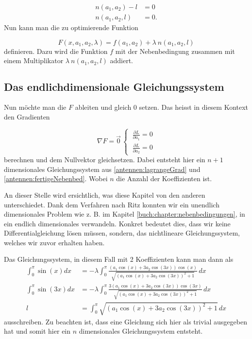 \begin{equation}
\begin{aligned}
	n(a_1, a_2) - l
	&=
	0
	\\
	n(a_1, a_2, l)
	&=
	0.
\label{antennen:fertigeNebenbed}
\end{aligned}
\end{equation}
Nun kann man die zu optimierende Funktion

\begin{equation}
F(x,a_1,a_2,\lambda)
= 
f(a_1,a_2)+\lambda \: n(a_1,a_2, l)
\end{equation}
definieren. Dazu wird die Funktion $f$ mit der Nebenbedingung zusammen mit einem
Multiplikator $\lambda \: n (a_1,a_2, l)$ addiert.

\subsection{Das endlichdimensionale Gleichungssystem\label{antennen:lagrangeGLsys}}

Nun möchte man die  $F$ ableiten und gleich 0 setzen. Das heisst in diesem Kontext
den Gradienten

\begin{equation}
	\nabla F = \vec{0} \,
	\left\{ \:
	\begin{aligned}
		\frac{\partial L}{\partial a_1} = 0 \\
		\frac{\partial L}{\partial a_2} = 0
	\end{aligned}
	\right.
	\label{antennen:lagrangeGrad}
\end{equation}
berechnen und dem Nullvektor gleichsetzen. Dabei entsteht hier ein 
$n+1$ dimensionales Gleichungssystem aus \eqref{antennen:lagrangeGrad} und \eqref{antennen:fertigeNebenbed}. 
Wobei $n$ die Anzahl der Koeffizienten ist.

An dieser Stelle wird ersichtlich, was diese Kapitel von den anderen unterschiedet. Dank dem Verfahren nach Ritz konnten wir ein unendlich dimensionales
Problem wie z. B. im Kapitel \ref{buch:chapter:nebenbedingungen}, in ein endlich dimensionales verwandeln. 
Konkret bedeutet dies, dass wir keine Differentialgleichung lösen müssen, sondern, 
das nichtlineare Gleichungssystem, welches wir zuvor erhalten haben.

Das Gleichungssystem, in diesem Fall mit 
2 Koeffizienten kann man dann als
\begin{equation}
	\begin{aligned}
		\int_0^\pi \sin (x) dx
		&=
		-\lambda \int_0^\pi \frac{\left(a_1 \cos (x)+3 a_2 \cos (3 x)\right) 
			\cos (x)}{\sqrt{\left(a_1 \cos (x)+3 a_2 \cos (3 x)\right)^2+1}} \, dx \\
		\int_0^\pi \sin (3 x) dx
		&=
		-\lambda \int_0^\pi \frac{3\left(a_1 \cos (x)+3 a_2 \cos (3 x)\right) 
			\cos (3 x)}{\sqrt{\left(a_1 \cos (x)+3 a_2 \cos (3 x)\right)^2+1}} \, dx \\
		l
		&=
		\int_0^\pi \sqrt{\left(a_1 \cos (x)+3 a_2 \cos (3 x)\right)^2+1} \, dx
	\end{aligned}
	\label{antennen:lagrangeGradKonkret}
\end{equation}
ausschreiben. Zu beachten ist, dass eine Gleichung sich hier
als trivial ausgegeben hat und somit hier ein $n$ dimensionales Gleichungssystem entsteht.

